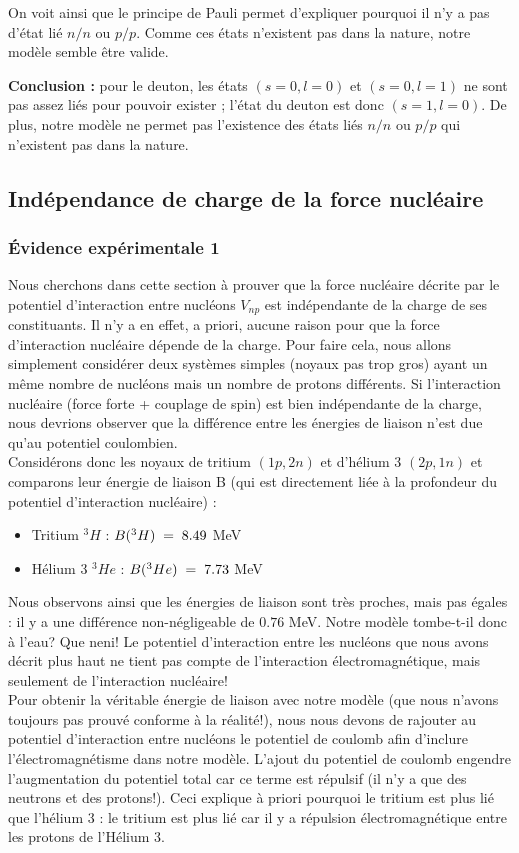 On voit ainsi que le principe de Pauli permet d'expliquer pourquoi il n'y a pas d'état lié $n/n$ ou $p/p$. Comme ces états n'existent pas dans la nature, notre modèle semble être valide.

\textbf{Conclusion :} pour le deuton, les états $(s=0,l=0)$ et $(s=0,l=1)$ ne sont pas assez liés pour pouvoir exister ; l'état du deuton est donc $(s=1,l=0)$. De plus, notre modèle ne permet pas l'existence des états liés $n/n$ ou $p/p$ qui n'existent pas dans la nature.


\subsection{Indépendance de charge de la force nucléaire}
\subsubsection{Évidence expérimentale 1}

Nous cherchons dans cette section à prouver que la force nucléaire décrite par le potentiel d'interaction entre nucléons $V_{np}$ est indépendante de la charge de ses constituants. Il n'y a en effet, a priori, aucune raison pour que la force d'interaction nucléaire dépende de la charge. Pour faire cela, nous allons simplement considérer deux systèmes simples (noyaux pas trop gros) ayant un même nombre de nucléons mais un nombre de protons différents. Si l'interaction nucléaire (force forte + couplage de spin) est bien indépendante de la charge, nous devrions observer que la différence entre les énergies de liaison n'est due qu'au potentiel coulombien.\\

Considérons donc les noyaux de tritium $(1p,2n)$ et d'hélium 3 $(2p,1n)$ et comparons leur énergie de liaison B (qui est directement liée à la profondeur du potentiel d'interaction nucléaire) :
\begin{itemize}[label=$\bullet$]
    \item Tritium $^3H$ : $B(^3H) \; = \; 8.49$ MeV
    \item Hélium 3 $^3He$ : $B(^3He) \; = \; 7.73$ MeV
\end{itemize}
Nous observons ainsi que les énergies de liaison sont très proches, mais pas égales : il y a une différence non-négligeable de $0.76$ MeV. Notre modèle tombe-t-il donc à l'eau? Que neni! Le potentiel d'interaction entre les nucléons que nous avons décrit plus haut ne tient pas compte de l'interaction électromagnétique, mais seulement de l'interaction nucléaire!\\
Pour obtenir la véritable énergie de liaison avec notre modèle (que nous n'avons toujours pas prouvé conforme à la réalité!), nous nous devons de rajouter au potentiel d'interaction entre nucléons le potentiel de coulomb afin d'inclure l'électromagnétisme dans notre modèle. L'ajout du potentiel de coulomb engendre l'augmentation du potentiel total car ce terme est répulsif (il n'y a que des neutrons et des protons!). Ceci explique à priori pourquoi le tritium est plus lié que l'hélium 3 : le tritium est plus lié car il y a répulsion électromagnétique entre les protons de l'Hélium 3.\\

